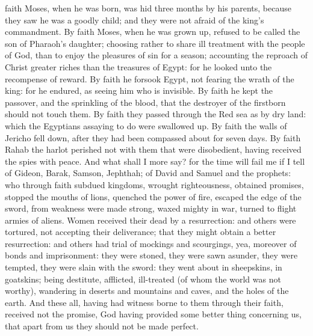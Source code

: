 faith Moses, when he was born, was hid three months by his parents, because they saw he was a goodly child; and they were not afraid of the king’s commandment. By faith Moses, when he was grown up, refused to be called the son of Pharaoh’s daughter; choosing rather to share ill treatment with the people of God, than to enjoy the pleasures of sin for a season; accounting the reproach of Christ greater riches than the treasures of Egypt: for he looked unto the recompense of reward. By faith he forsook Egypt, not fearing the wrath of the king: for he endured, as seeing him who is invisible. By faith he kept the passover, and the sprinkling of the blood, that the destroyer of the firstborn should not touch them. By faith they passed through the Red sea as by dry land: which the Egyptians assaying to do were swallowed up. By faith the walls of Jericho fell down, after they had been compassed about for seven days. By faith Rahab the harlot perished not with them that were disobedient, having received the spies with peace.  And what shall I more say? for the time will fail me if I tell of Gideon, Barak, Samson, Jephthah; of David and Samuel and the prophets: who through faith subdued kingdoms, wrought righteousness, obtained promises, stopped the mouths of lions, quenched the power of fire, escaped the edge of the sword, from weakness were made strong, waxed mighty in war, turned to flight armies of aliens. Women received their dead by a resurrection: and others were tortured, not accepting their deliverance; that they might obtain a better resurrection: and others had trial of mockings and scourgings, yea, moreover of bonds and imprisonment: they were stoned, they were sawn asunder, they were tempted, they were slain with the sword: they went about in sheepskins, in goatskins; being destitute, afflicted, ill-treated (of whom the world was not worthy), wandering in deserts and mountains and caves, and the holes of the earth. And these all, having had witness borne to them through their faith, received not the promise, God having provided some better thing concerning us, that apart from us they should not be made perfect. 

